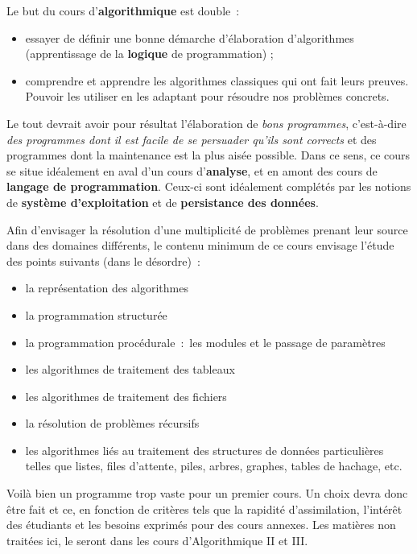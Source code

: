 		Le but du cours d'\textbf{algorithmique} est double~:
	
		\begin{itemize}
		\item
			essayer de définir une bonne démarche d’élaboration d’algorithmes
			(apprentissage de la \textbf{logique} de programmation) ;
		\item
			comprendre et apprendre les algorithmes classiques 
			qui ont fait leurs preuves.
			Pouvoir les utiliser en les adaptant 
			pour résoudre nos problèmes concrets.
		\end{itemize}
	
		Le tout devrait avoir pour résultat l’élaboration 
		de \textit{bons programmes}, 
		c’est-à-dire \textit{des programmes dont il est facile de
		se persuader qu’ils sont corrects} et des programmes dont la
		maintenance est la plus aisée possible. 
		Dans ce sens, ce cours se situe idéalement 
		en aval d’un cours d’\textbf{analyse}, 
		et en amont des cours de \textbf{langage de programmation}. 
		Ceux-ci sont idéalement complétés
		par les notions de \textbf{système d’exploitation} et de
		\textbf{persistance des données}.
	
		Afin d’envisager la résolution d’une multiplicité 
		de problèmes prenant leur source dans des domaines différents, 
		le contenu minimum de ce cours envisage l’étude des points suivants 
		(dans le désordre)~:
	
		\begin{itemize}
		\item 
			la représentation des algorithmes
		\item
			la programmation structurée
		\item
			la programmation procédurale~:~les modules et 
			le passage de paramètres
		\item
			les algorithmes de traitement des tableaux
		\item
			les algorithmes de traitement des fichiers
		\item
			la résolution de problèmes récursifs
		\item
			les algorithmes liés au traitement des structures de données particulières telles
			que listes, files d’attente, piles, arbres, graphes, tables de hachage,
			etc.
		\end{itemize}
	
		Voilà bien un programme trop vaste pour un premier cours.  
		Un choix devra donc être fait et ce, en fonction
		de critères tels que la rapidité d’assimilation, l’intérêt des
		étudiants et les besoins exprimés pour des cours annexes. 
		Les matières non traitées ici, 
		le seront dans les cours d'Algorithmique II et III. 
	
